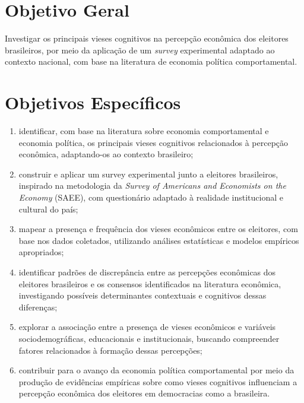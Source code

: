 \section{Objetivo Geral}

Investigar os principais vieses cognitivos na percepção econômica dos eleitores brasileiros, por meio da aplicação de um \textit{survey} experimental adaptado ao contexto nacional, com base na literatura de economia política comportamental.

\section{Objetivos Específicos}

\begin{enumerate}[label=\alph*)]
    \item identificar, com base na literatura sobre economia comportamental e economia política, os principais vieses cognitivos relacionados à percepção econômica, adaptando-os ao contexto brasileiro;

    \item construir e aplicar um survey experimental junto a eleitores brasileiros, inspirado na metodologia da \textit{Survey of Americans and Economists on the Economy} (SAEE), com questionário adaptado à realidade institucional e cultural do país;

    \item mapear a presença e frequência dos vieses econômicos entre os eleitores, com base nos dados coletados, utilizando análises estatísticas e modelos empíricos apropriados;

    \item identificar padrões de discrepância entre as percepções econômicas dos eleitores brasileiros e os consensos identificados na literatura econômica, investigando possíveis determinantes contextuais e cognitivos dessas diferenças;

    \item explorar a associação entre a presença de vieses econômicos e variáveis sociodemográficas, educacionais e institucionais, buscando compreender fatores relacionados à formação dessas percepções;

    \item contribuir para o avanço da economia política comportamental por meio da produção de evidências empíricas sobre como vieses cognitivos influenciam a percepção econômica dos eleitores em democracias como a brasileira.

\end{enumerate}

